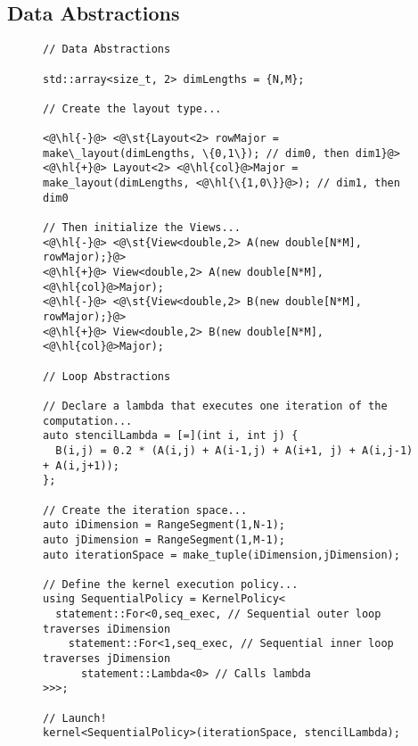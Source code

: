 \subsection{Data Abstractions}
\begin{figure}
\begin{lstlisting}[caption={Diff for applying global layout transformations in RAJA version of 5-point stencil code. The new code uses column-major instead of row-major.}, label=stencilRAJADiff]
// Data Abstractions

std::array<size_t, 2> dimLengths = {N,M};

// Create the layout type...

<@\hl{-}@> <@\st{Layout<2> rowMajor = make\_layout(dimLengths, \{0,1\}); // dim0, then dim1}@>
<@\hl{+}@> Layout<2> <@\hl{col}@>Major = make_layout(dimLengths, <@\hl{\{1,0\}}@>); // dim1, then dim0

// Then initialize the Views...
<@\hl{-}@> <@\st{View<double,2> A(new double[N*M], rowMajor);}@>
<@\hl{+}@> View<double,2> A(new double[N*M], <@\hl{col}@>Major); 
<@\hl{-}@> <@\st{View<double,2> B(new double[N*M], rowMajor);}@>
<@\hl{+}@> View<double,2> B(new double[N*M], <@\hl{col}@>Major);

// Loop Abstractions

// Declare a lambda that executes one iteration of the computation...
auto stencilLambda = [=](int i, int j) {
  B(i,j) = 0.2 * (A(i,j) + A(i-1,j) + A(i+1, j) + A(i,j-1) + A(i,j+1));
};

// Create the iteration space...
auto iDimension = RangeSegment(1,N-1);
auto jDimension = RangeSegment(1,M-1);
auto iterationSpace = make_tuple(iDimension,jDimension);

// Define the kernel execution policy...
using SequentialPolicy = KernelPolicy<
  statement::For<0,seq_exec, // Sequential outer loop traverses iDimension
    statement::For<1,seq_exec, // Sequential inner loop traverses jDimension
      statement::Lambda<0> // Calls lambda
>>>;

// Launch!
kernel<SequentialPolicy>(iterationSpace, stencilLambda);
\end{lstlisting}
\end{figure}


